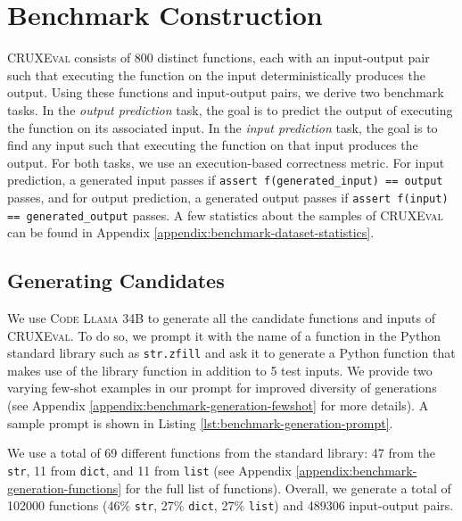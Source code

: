\documentclass{article}
\newcommand{\benchmark}{\textsc{CRUXEval}\xspace}
\newcommand{\codellamalarge}{\textsc{Code Llama 34B}\xspace}
\begin{document}

\section{Benchmark Construction} \label{sec:benchmark-construction}

\benchmark consists of 800 distinct functions, each with an input-output pair such that executing the function on the input deterministically produces the output. Using these functions and input-output pairs, we derive two benchmark tasks. In the \textit{output prediction} task, the goal is to predict the output of executing the function on its associated input. In the \textit{input prediction} task, the goal is to find any input such that executing the function on that input produces the output. For both tasks, we use an execution-based correctness metric. For input prediction, a generated input passes if \texttt{assert f(generated\_input) == output} passes, and for output prediction, a generated output passes if \texttt{assert f(input) == generated\_output} passes. A few statistics about the samples of \benchmark can be found in Appendix \ref{appendix:benchmark-dataset-statistics}.

\subsection{Generating Candidates} \label{subsec:generating-candidates}
We use \codellamalarge to generate all the candidate functions and inputs of \benchmark. To do so, we prompt it with the name of a function in the Python standard library such as \texttt{str.zfill} and ask it to generate a Python function that makes use of the library function in addition to 5 test inputs. We provide two varying few-shot examples in our prompt for improved diversity of generations (see Appendix \ref{appendix:benchmark-generation-fewshot} for more details). A sample prompt is shown in Listing \ref{lst:benchmark-generation-prompt}.

We use a total of 69 different functions from the standard library: 47 from the \texttt{str}, 11 from \texttt{dict}, and 11 from \texttt{list} (see Appendix \ref{appendix:benchmark-generation-functions} for the full list of functions). Overall, we generate a total of 102000 functions (46\% \texttt{str}, 27\% \texttt{dict}, 27\% \texttt{list}) and 489306 input-output pairs.

\end{document}
